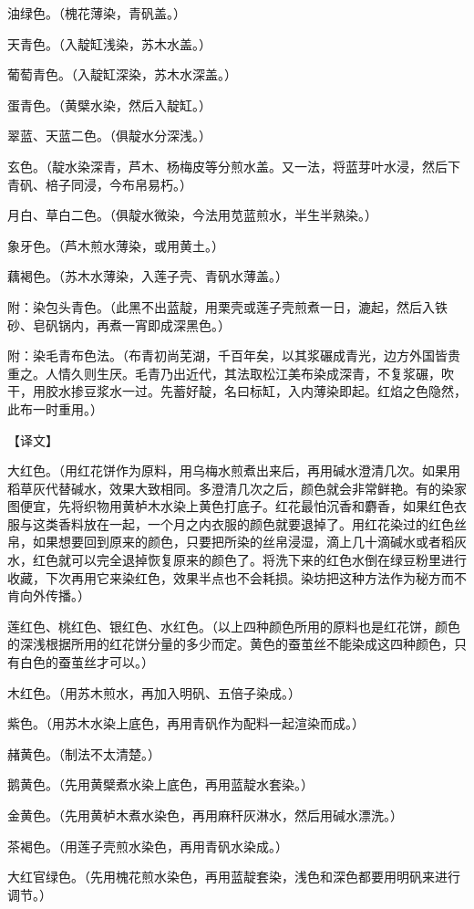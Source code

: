 \documentclass[12pt,UTF8]{ctexbook}
\begin{document}
油绿色。（槐花薄染，青矾盖。）

天青色。（入靛缸浅染，苏木水盖。）

葡萄青色。（入靛缸深染，苏木水深盖。）

蛋青色。（黄檗水染，然后入靛缸。）

翠蓝、天蓝二色。（俱靛水分深浅。）

玄色。（靛水染深青，芦木、杨梅皮等分煎水盖。又一法，将蓝芽叶水浸，然后下青矾、棓子同浸，今布帛易朽。）

月白、草白二色。（俱靛水微染，今法用苋蓝煎水，半生半熟染。）

象牙色。（芦木煎水薄染，或用黄土。）

藕褐色。（苏木水薄染，入莲子壳、青矾水薄盖。）

附：染包头青色。（此黑不出蓝靛，用栗壳或莲子壳煎煮一日，漉起，然后入铁砂、皂矾锅内，再煮一宵即成深黑色。）

附：染毛青布色法。（布青初尚芜湖，千百年矣，以其浆碾成青光，边方外国皆贵重之。人情久则生厌。毛青乃出近代，其法取松江美布染成深青，不复浆碾，吹干，用胶水掺豆浆水一过。先蓄好靛，名曰标缸，入内薄染即起。红焰之色隐然，此布一时重用。）

【译文】

大红色。（用红花饼作为原料，用乌梅水煎煮出来后，再用碱水澄清几次。如果用稻草灰代替碱水，效果大致相同。多澄清几次之后，颜色就会非常鲜艳。有的染家图便宜，先将织物用黄栌木水染上黄色打底子。红花最怕沉香和麝香，如果红色衣服与这类香料放在一起，一个月之内衣服的颜色就要退掉了。用红花染过的红色丝帛，如果想要回到原来的颜色，只要把所染的丝帛浸湿，滴上几十滴碱水或者稻灰水，红色就可以完全退掉恢复原来的颜色了。将洗下来的红色水倒在绿豆粉里进行收藏，下次再用它来染红色，效果半点也不会耗损。染坊把这种方法作为秘方而不肯向外传播。）

莲红色、桃红色、银红色、水红色。（以上四种颜色所用的原料也是红花饼，颜色的深浅根据所用的红花饼分量的多少而定。黄色的蚕茧丝不能染成这四种颜色，只有白色的蚕茧丝才可以。）

木红色。（用苏木煎水，再加入明矾、五倍子染成。）

紫色。（用苏木水染上底色，再用青矾作为配料一起渲染而成。）

赭黄色。（制法不太清楚。）

鹅黄色。（先用黄檗煮水染上底色，再用蓝靛水套染。）

金黄色。（先用黄栌木煮水染色，再用麻秆灰淋水，然后用碱水漂洗。）

茶褐色。（用莲子壳煎水染色，再用青矾水染成。）

大红官绿色。（先用槐花煎水染色，再用蓝靛套染，浅色和深色都要用明矾来进行调节。）
\end{document}
